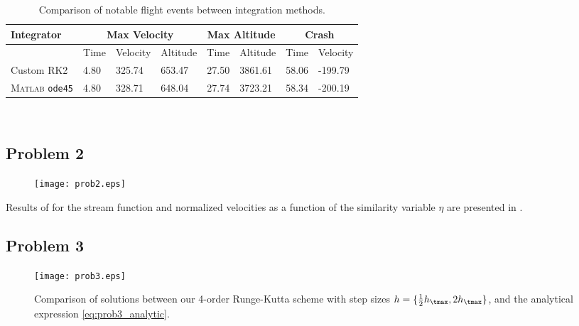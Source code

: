 \documentclass[12pt]{article}
\begin{document}
\begin{table}[t]
\centering
\begin{tabular}{llllllll}
\toprule
Integrator   & \multicolumn{3}{c}{Max Velocity} & \multicolumn{2}{c}{Max Altitude} & \multicolumn{2}{c}{Crash} \\
\midrule
~            & Time & Velocity & Altitude       & Time         & Altitude & Time  & Velocity \\
Custom RK2                        & 4.80 & 325.74   & 653.47  & 27.50  & 3861.61  & 58.06 & -199.79  \\
\textsc{Matlab} \lstinline|ode45| & 4.80 & 328.71   & 648.04  & 27.74  & 3723.21  & 58.34 & -200.19 \\
\bottomrule
\end{tabular}
\\[6pt]
\caption{Comparison of notable flight events between integration methods.}
\label{tbl:rocket}
\end{table}

\subsection{Problem 2}

\begin{figure}[t]
\begin{center}
\texttt{[image: prob2.eps]}
\\[6pt]
\caption{}
\label{fig:prob2}
\end{center}
\end{figure}

Results of for the stream function and normalized velocities as a function of the similarity variable $\eta$ are presented in .

\subsection{Problem 3}

\begin{figure}[t]
\begin{center}
\texttt{[image: prob3.eps]}
\\[6pt]
\caption{Comparison of solutions between our 4\nd-order Runge-Kutta scheme with step sizes $h = \{ \tfrac{1}{2} h_\tmax, 2 h_\tmax \}$, and the analytical expression \eqref{eq:prob3_analytic}.}
\label{fig:prob3}
\end{center}
\end{figure}
\end{document}
